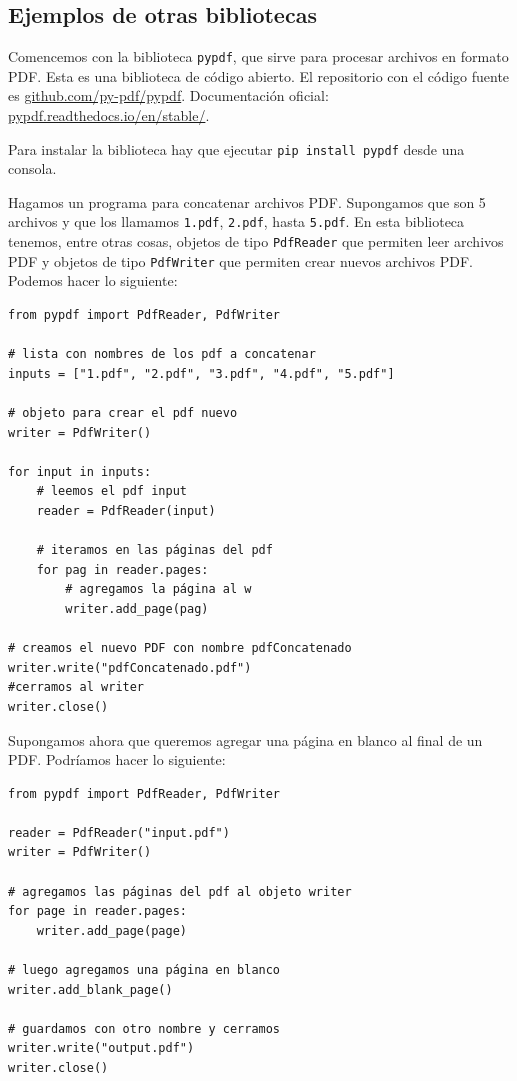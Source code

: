\documentclass[a4paper, 12pt]{report}
\theoremstyle{definition}
\begin{document}
\subsection{Ejemplos de otras bibliotecas}

Comencemos con la biblioteca {\tt pypdf}, que sirve para procesar archivos en formato PDF. Esta es una biblioteca de código abierto. El repositorio con el código fuente es \href{https://github.com/py-pdf/pypdf}{github.com/py-pdf/pypdf}. Documentación oficial: \href{https://pypdf.readthedocs.io/en/stable/}{pypdf.readthedocs.io/en/stable/}.

Para instalar la biblioteca hay que ejecutar {\tt pip install pypdf} desde una consola.

Hagamos un programa para concatenar archivos PDF. Supongamos que son 5 archivos y que los llamamos {\tt 1.pdf}, {\tt 2.pdf}, hasta {\tt 5.pdf}. En esta biblioteca tenemos, entre otras cosas, objetos de tipo {\tt PdfReader} que permiten leer archivos PDF y objetos de tipo {\tt PdfWriter} que permiten crear nuevos archivos PDF. Podemos hacer lo siguiente:
\begin{verbatim}
from pypdf import PdfReader, PdfWriter

# lista con nombres de los pdf a concatenar
inputs = ["1.pdf", "2.pdf", "3.pdf", "4.pdf", "5.pdf"]

# objeto para crear el pdf nuevo
writer = PdfWriter()

for input in inputs:
    # leemos el pdf input
    reader = PdfReader(input)
    
    # iteramos en las páginas del pdf
    for pag in reader.pages:
        # agregamos la página al w
        writer.add_page(pag)

# creamos el nuevo PDF con nombre pdfConcatenado
writer.write("pdfConcatenado.pdf")
#cerramos al writer
writer.close()
\end{verbatim}

Supongamos ahora que queremos agregar una página en blanco al final de un PDF. Podríamos hacer lo siguiente:
\begin{verbatim}
from pypdf import PdfReader, PdfWriter

reader = PdfReader("input.pdf")
writer = PdfWriter()

# agregamos las páginas del pdf al objeto writer
for page in reader.pages:
    writer.add_page(page)

# luego agregamos una página en blanco
writer.add_blank_page()

# guardamos con otro nombre y cerramos
writer.write("output.pdf")
writer.close()
\end{verbatim}
\end{document}
